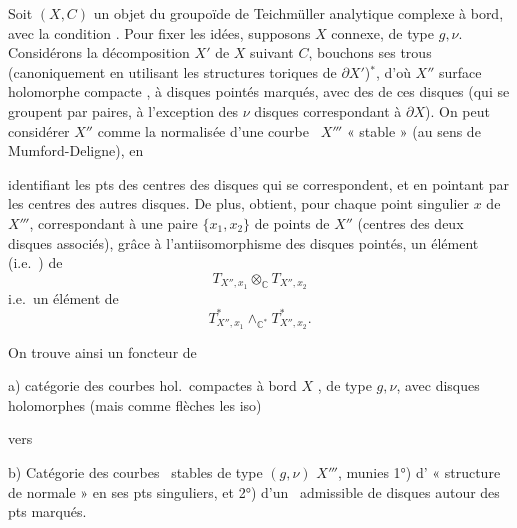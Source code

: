 \documentclass[11pt,a4paper]{article}
\begin{document}
Soit $(X, C)$ un objet du groupoïde de Teichmüller analytique complexe à
bord, avec la condition . Pour fixer les idées,
supposons $X$ connexe, de type $g,\nu$. Considérons la décomposition $X'$
de $X$ suivant $C$, bouchons ses trous (canoniquement en utilisant les
structures toriques de $\partial X'$)$^{*}$, d'où $X''$ surface holomorphe
compacte , à disques pointés marqués, avec des
    de
ces disques (qui se groupent  par paires, à
l'exception des $\nu$ disques correspondant à $\partial X$).
On peut considérer $X''$ comme la normalisée d'une courbe
\ $X'''$ \struck{\ill{}} « stable » (au sens
de Mumford-Deligne), en


identifiant les pts des centres des disques qui se correspondent, et en
pointant par les centres des autres disques. De plus, 
obtient, \struck{\ill{}} pour chaque point singulier $x$ de $X'''$,
correspondant à une paire $\{x_1, x_2\}$ de points de $X''$ (centres des
deux disques associés), grâce à l'antiisomorphisme des 
disques pointés, un élément \struck{\ill{}} (i.e.\ \ill{}) de
\[
  T_{X'',x_1} \otimes_{\mathbb{C}} T_{X'',x_2}
\]
i.e.\ un élément de
\[
  T^{*}_{X'',x_1} \wedge_{\mathbb{C}^{*}} T^{*}_{X'',x_2} .
\]

On trouve ainsi un foncteur de

a) catégorie des courbes hol.\ compactes à bord $X$ ,
de type $g,\nu$, avec disques holomorphes (mais comme flèches les iso)

vers

b) Catégorie des courbes \ stables de type
$(g,\nu)$ $X'''$, munies 1°) d' « structure de
 normale » en ses pts singuliers, et 2°) d'un
 \ admissible de disques
autour des pts marqués.

\end{document}
